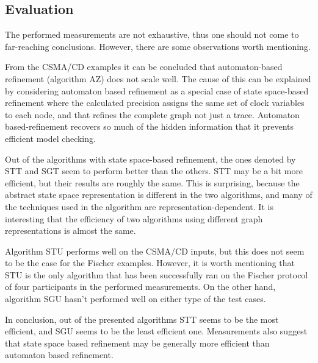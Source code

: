 \subsection{Evaluation}

The performed measurements are not exhaustive, thus one should not come to far-reaching conclusions. However, there are some observations worth mentioning.

From the CSMA/CD examples it can be concluded that automaton-based refinement (algorithm AZ) does not scale well. The cause of this can be explained by considering automaton based refinement as a special case of state space-based refinement where the calculated precision assigns the same set of clock variables to each node, and that refines the complete graph not just a trace. Automaton based-refinement recovers so much of the hidden information that it prevents efficient model checking.

Out of the algorithms with state space-based refinement, the ones denoted by STT and SGT seem to perform better than the others. STT may be a bit more efficient, but their results are roughly the same. This is surprising, because the abstract state space representation is different in the two algorithms, and many of the techniques used in the algorithm are representation-dependent. It is interesting that the efficiency of two algorithms using different graph representations is almost the same.

Algorithm STU performs well on the CSMA/CD inputs, but this does not seem to be the case for the Fischer examples. However, it is worth mentioning that STU is the only algorithm that has been successfully ran on the Fischer protocol of four participants in the performed measurements. On the other hand, algorithm SGU hasn't performed well on either type of the test cases.

In conclusion, out of the presented algorithms STT seems to be the most efficient, and SGU seems to be the least efficient one. Measurements also suggest that state space based refinement may be generally more efficient than automaton based refinement.




